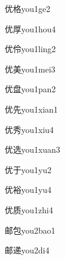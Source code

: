 \begin{verbete}[6;10]{优格}{you1ge2}
\end{verbete}

\begin{verbete}[6;9]{优厚}{you1hou4}
\end{verbete}

\begin{verbete}[6;7]{优伶}{you1ling2}
\end{verbete}

\begin{verbete}[6;9]{优美}{you1mei3}
\end{verbete}

\begin{verbete}[6;11]{优盘}{you1pan2}
\end{verbete}

\begin{verbete}[6;6]{优先}{you1xian1}
\end{verbete}

\begin{verbete}[6;7]{优秀}{you1xiu4}
\end{verbete}

\begin{verbete}[6;9]{优选}{you1xuan3}
\end{verbete}

\begin{verbete}[6;3]{优于}{you1yu2}
\end{verbete}

\begin{verbete}[6;12]{优裕}{you1yu4}
\end{verbete}

\begin{verbete}[6;8]{优质}{you1zhi4}
\end{verbete}

\begin{verbete}[7;5]{邮包}{you2bao1}
\end{verbete}

\begin{verbete}[7;10]{邮递}{you2di4}
\end{verbete}

